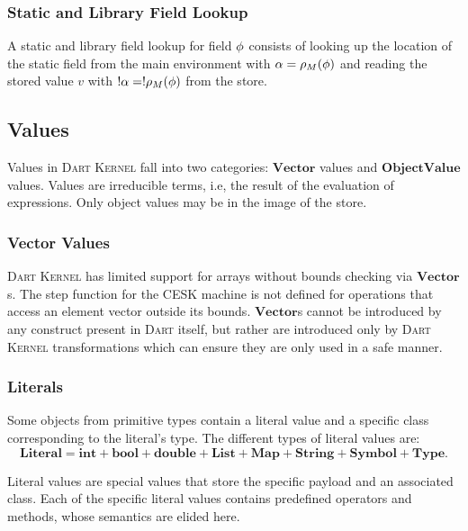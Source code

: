 \documentclass[a4paper,oneside,fleqn]{article}
\newcommand{\kernel}{\textsc{Dart Kernel}}
\newcommand{\dart}{\textsc{Dart}}
\newcommand{\dlit}{\mathbf{Literal}}
\newcommand{\dobjval}{\mathbf{ObjectValue}}
\newcommand{\dvector}{\mathbf{Vector}}
\newcommand{\dtype}{\mathbf{Type}}
\newcommand{\dsemint}{\mathbf{int}}
\newcommand{\dsembool}{\mathbf{bool}}
\newcommand{\dsemdouble}{\mathbf{double}}
\newcommand{\dsemlist}{\mathbf{List}}
\newcommand{\dsemmap}{\mathbf{Map}}
\newcommand{\dsemstring}{\mathbf{String}}
\newcommand{\dsemsymbol}{\mathbf{Symbol}}
\begin{document}
\subsubsection{Static and Library Field Lookup}
\label{subsubsec:static-field-lookup}

A static and library field lookup for field $\phi$ consists of looking up the location of the static field from the main environment with $\alpha = \rho_{M}(\phi)$ and reading the stored value $v$ with $!\alpha = !\rho_{M}(\phi)$ from the store.


\subsection{Values}
\label{sec:values}

Values in \kernel{} fall into two categories: $\dvector$ values and $\dobjval$ values.
Values are irreducible terms, i.e, the result of the evaluation of expressions.
Only object values may be in the image of the store.

\subsubsection{Vector Values}
\label{subsubsec:vector-values}

\kernel{} has limited support for arrays without bounds checking via $\dvector$s.
The step function for the CESK machine is not defined for operations that access an element vector outside its bounds.
$\dvector$s cannot be introduced by any construct present in \dart{} itself, but rather are introduced only by \kernel{} transformations which can ensure they are only used in a safe manner.

\subsubsection{Literals}

Some objects from primitive types contain a literal value and a specific class corresponding to the literal's type.
The different types of literal values are:
\[\dlit = \dsemint + \dsembool + \dsemdouble + \dsemlist + \dsemmap + \dsemstring + \dsemsymbol + \dtype.\]

Literal values are special values that store the specific payload and an associated class.
Each of the specific literal values contains predefined operators and methods, whose semantics are elided here.
\end{document}
